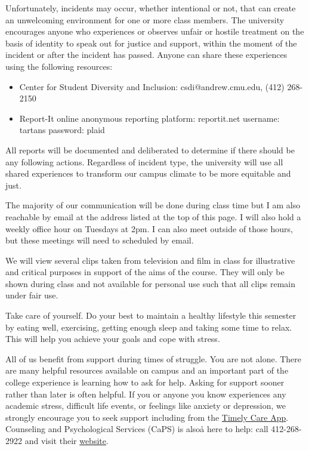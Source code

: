 \documentclass[11pt, a4paper]{article}
\begin{document}
Unfortunately, incidents may occur, whether intentional or not, that can create
an unwelcoming environment for one or more class members. The university
encourages anyone who experiences or observes unfair or hostile treatment on the
basis of identity to speak out for justice and support, within the moment of the
incident or after the incident has passed. Anyone can share these experiences
using the following resources:
\begin{itemize}
    \item Center for Student Diversity and Inclusion: csdi@andrew.cmu.edu, (412)
268-2150 
    \item Report-It online anonymous reporting platform: reportit.net username:
tartans password: plaid 
\end{itemize}
\noindent All reports will be documented and deliberated to determine if there
should be any following actions. Regardless of incident type, the university
will use all shared experiences to transform our campus climate to be more
equitable and just.

\vspace{.4cm}

\noindent The majority of our communication will be done during class time but I
am also reachable by email at the address listed at the top of this page. I will
also hold a weekly office hour on Tuesdays at 2pm. I can also meet outside of
those hours, but these meetings will need to scheduled by email. 
\vspace{.4cm}

\noindent We will view several clips taken from television and film in class for
illustrative and critical purposes in support of the aims of the course. They
will only be shown during class and not available for personal use such that all 
clips remain under fair use.   
\vspace{.4cm}

\noindent Take care of yourself. Do your best to maintain a healthy lifestyle
this semester by eating well, exercising, getting enough sleep and taking some
time to relax. This will help you achieve your goals and cope with stress. 

All of us benefit from support during times of struggle. You are not alone.
There are many helpful resources available on campus and an important part of
the college experience is learning how to ask for help. Asking for support
sooner rather than later is often helpful. If you or anyone you know experiences
any academic stress, difficult life events, or feelings like anxiety or
depression, we strongly encourage you to seek support including from the
\href{https://www.cmu.edu/wellbeing/resources/timely-care.html}{Timely Care
App}. Counseling and Psychological Services (CaPS) is alsoå here to help: call
412-268-2922 and visit their \href{http://www.cmu.edu/counseling/}{website}.
\end{document}
